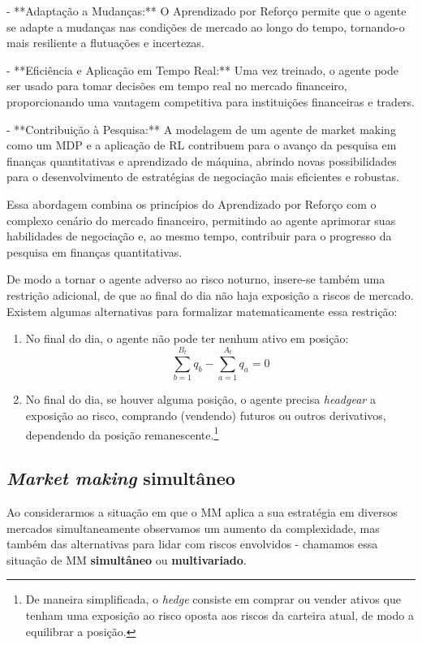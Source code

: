 - **Adaptação a Mudanças:** O Aprendizado por Reforço permite que o agente se adapte a mudanças nas condições de mercado ao longo do tempo, tornando-o mais resiliente a flutuações e incertezas.

- **Eficiência e Aplicação em Tempo Real:** Uma vez treinado, o agente pode ser usado para tomar decisões em tempo real no mercado financeiro, proporcionando uma vantagem competitiva para instituições financeiras e traders.

- **Contribuição à Pesquisa:** A modelagem de um agente de market making como um MDP e a aplicação de RL contribuem para o avanço da pesquisa em finanças quantitativas e aprendizado de máquina, abrindo novas possibilidades para o desenvolvimento de estratégias de negociação mais eficientes e robustas.

Essa abordagem combina os princípios do Aprendizado por Reforço com o complexo cenário do mercado financeiro, permitindo ao agente aprimorar suas habilidades de negociação e, ao mesmo tempo, contribuir para o progresso da pesquisa em finanças quantitativas.

De modo a tornar o agente adverso ao risco noturno, insere-se também uma restrição adicional, de que ao final do dia não haja exposição a riscos de mercado. 
Existem algumas alternativas para formalizar matematicamente essa restrição:
\begin{enumerate}
    \item No final do dia, o agente não pode ter nenhum ativo em posição: 
    \begin{equation}
        \sum_{b=1}^{B_t} q_b  - \sum_{a=1}^{A_t} q_a = 0\label{eq:eod_restriction}
    \end{equation}
    \item No final do dia, se houver alguma posição, o agente precisa \textit{headgear} a exposição ao risco, comprando (vendendo) futuros ou outros derivativos, dependendo da posição remanescente.\footnote{De maneira simplificada, o \textit{hedge} consiste em comprar ou vender ativos que tenham uma exposição ao risco oposta aos riscos da carteira atual, de modo a equilibrar a posição.}
\end{enumerate}

\subsection{\textit{Market making} simultâneo}
Ao considerarmos a situação em que o MM aplica a sua estratégia em diversos mercados simultaneamente observamos um aumento da complexidade, mas também das alternativas para lidar com riscos envolvidos - chamamos essa situação de MM \textbf{simultâneo} ou \textbf{multivariado}.

